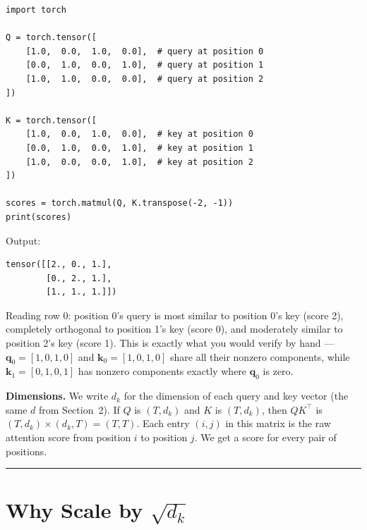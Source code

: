 \demotag
\begin{lstlisting}
import torch

Q = torch.tensor([
    [1.0,  0.0,  1.0,  0.0],  # query at position 0
    [0.0,  1.0,  0.0,  1.0],  # query at position 1
    [1.0,  1.0,  0.0,  0.0],  # query at position 2
])

K = torch.tensor([
    [1.0,  0.0,  1.0,  0.0],  # key at position 0
    [0.0,  1.0,  0.0,  1.0],  # key at position 1
    [1.0,  0.0,  0.0,  1.0],  # key at position 2
])

scores = torch.matmul(Q, K.transpose(-2, -1))
print(scores)
\end{lstlisting}

Output:

\outputtag
\begin{lstlisting}
tensor([[2., 0., 1.],
        [0., 2., 1.],
        [1., 1., 1.]])
\end{lstlisting}

Reading row 0: position 0's query is most similar to position 0's key (score 2), completely orthogonal to position 1's key (score 0), and moderately similar to position 2's key (score 1). This is exactly what you would verify by hand --- $\mathbf{q}_0 = [1, 0, 1, 0]$ and $\mathbf{k}_0 = [1, 0, 1, 0]$ share all their nonzero components, while $\mathbf{k}_1 = [0, 1, 0, 1]$ has nonzero components exactly where $\mathbf{q}_0$ is zero.


\textbf{Dimensions.} We write $d_k$ for the dimension of each query and key vector (the same $d$ from Section~2). If $Q$ is $(T, d_k)$ and $K$ is $(T, d_k)$, then $QK^\top$ is $(T, d_k) \times (d_k, T) = (T, T)$. Each entry $(i, j)$ in this matrix is the raw attention score from position $i$ to position $j$. We get a score for every pair of positions.

\bigskip\hrule\bigskip

\section{Why Scale by $\sqrt{d_k}$}

